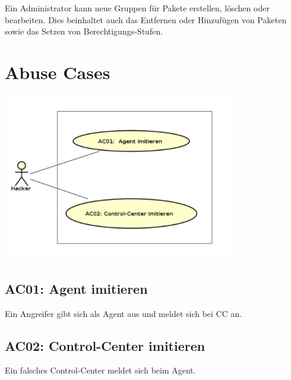 Ein Administrator kann neue Gruppen für Pakete erstellen, löschen oder bearbeiten. Dies beinhaltet auch das Entfernen oder Hinzufügen von Paketen sowie das Setzen von Berechtigungs-Stufen.

\section{Abuse Cases}

\begin{center}
    \includegraphics[width=0.75\textwidth]{files/AbuseCases_small}
\end{center}

\subsection*{AC01: Agent imitieren}
\label{auc:01}

Ein Angreifer gibt sich als Agent aus und meldet sich bei CC an.

\subsection*{AC02: Control-Center imitieren}
\label{auc:02}

Ein falsches Control-Center meldet sich beim Agent.